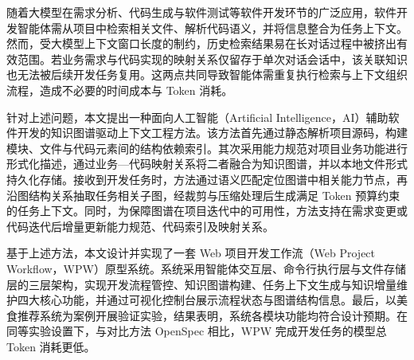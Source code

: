 \begin{ChineseAbstract}
随着大模型在需求分析、代码生成与软件测试等软件开发环节的广泛应用，软件开发智能体需从项目中检索相关文件、解析代码语义，并将信息整合为任务上下文。然而，受大模型上下文窗口长度的制约，历史检索结果易在长对话过程中被挤出有效范围。若业务需求与代码实现的映射关系仅留存于单次对话会话中，该关联知识也无法被后续开发任务复用。这两点共同导致智能体需重复执行检索与上下文组织流程，造成不必要的时间成本与 Token 消耗。

针对上述问题，本文提出一种面向人工智能（Artificial Intelligence，AI）辅助软件开发的知识图谱驱动上下文工程方法。该方法首先通过静态解析项目源码，构建模块、文件与代码元素间的结构依赖索引。其次采用能力规范对项目业务功能进行形式化描述，通过业务—代码映射关系将二者融合为知识图谱，并以本地文件形式持久化存储。接收到开发任务时，方法通过语义匹配定位图谱中相关能力节点，再沿图结构关系抽取任务相关子图，经裁剪与压缩处理后生成满足 Token 预算约束的任务上下文。同时，为保障图谱在项目迭代中的可用性，方法支持在需求变更或代码迭代后增量更新能力规范、代码索引及映射关系。

基于上述方法，本文设计并实现了一套 Web 项目开发工作流（Web Project Workflow，WPW）原型系统。系统采用智能体交互层、命令行执行层与文件存储层的三层架构，实现开发流程管控、知识图谱构建、任务上下文生成与知识增量维护四大核心功能，并通过可视化控制台展示流程状态与图谱结构信息。最后，以美食推荐系统为案例开展验证实验，结果表明，系统各模块功能均符合设计预期。在同等实验设置下，与对比方法 OpenSpec 相比，WPW 完成开发任务的模型总 Token 消耗更低。

\end{ChineseAbstract}

